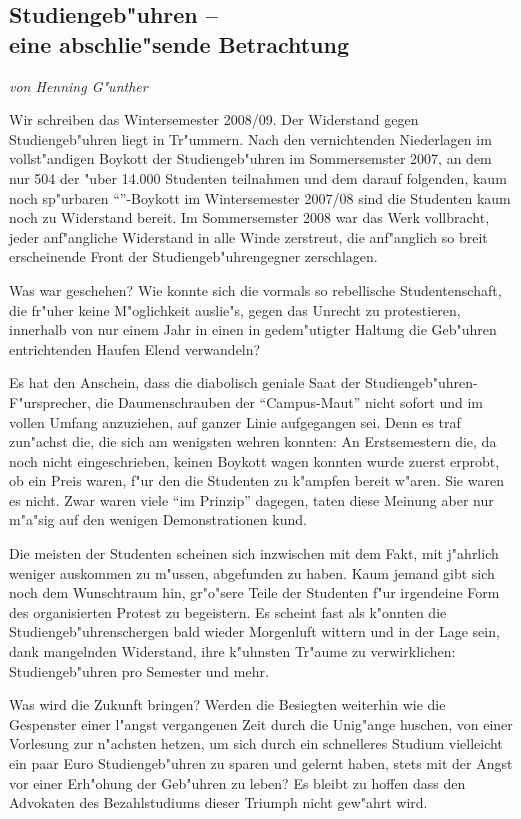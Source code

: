 \subsection[Studiengeb"uhren]{Studiengeb"uhren --\\ eine abschlie"sende
Betrachtung}
\emph{von Henning G"unther}

Wir schreiben das Wintersemester 2008/09.
Der Widerstand gegen Studiengeb"uhren liegt in Tr"ummern.
Nach den vernichtenden Niederlagen im voll\-st"an\-di\-gen Boykott der Studiengeb"uhren im Sommersemster 2007, an dem nur 504 der "uber 14.000 Studenten teilnahmen und dem darauf folgenden, kaum noch sp"urbaren "`\unit[5]{\EUR}{}"'-Boykott im Wintersemester 2007/08 sind die Studenten kaum noch zu Widerstand bereit.
Im Sommersemster 2008 war das Werk vollbracht, jeder anf"angliche Widerstand in alle Winde zerstreut, die anf"anglich so breit erscheinende Front der Studiengeb"uhrengegner zerschlagen.

Was war geschehen?
Wie konnte sich die vormals so rebellische Studentenschaft, die fr"uher keine M"oglichkeit auslie"s, gegen das Unrecht zu protestieren, innerhalb von nur einem Jahr in einen in gedem"utigter Haltung die Geb"uhren entrichtenden Haufen Elend verwandeln?

Es hat den Anschein, dass die diabolisch geniale Saat der Studiengeb"uhren-F"ursprecher, die Daumenschrauben der "`Campus-Maut"' nicht sofort und im vollen Umfang anzuziehen, auf ganzer Linie aufgegangen sei.
Denn es traf zun"achst die, die sich am wenigsten wehren konnten:
An Erstsemestern die, da noch nicht eingeschrieben, keinen Boykott wagen
konnten wurde zuerst erprobt, ob \unit[500]{\EUR}{} ein Preis waren, f"ur den die Studenten zu k"ampfen bereit w"aren. Sie waren es nicht.
Zwar waren viele "`im Prinzip"' dagegen, taten diese Meinung aber nur m"a"sig auf den wenigen Demonstrationen kund.

Die meisten der Studenten scheinen sich inzwischen mit dem Fakt, mit j"ahrlich
\unit[1000]{\EUR}{} weniger auskommen zu m"ussen, abgefunden zu haben. Kaum jemand gibt sich noch dem Wunschtraum hin, gr"o"sere Teile der Studenten f"ur irgendeine Form des organisierten Protest zu begeistern.
Es scheint fast als k"onnten die Studiengeb"uhrenschergen bald wieder Morgenluft wittern und in der Lage sein, dank mangelnden Widerstand, ihre k"uhnsten Tr"aume zu verwirklichen: \unit[1000]{\EUR}{} Studiengeb"uhren pro Semester und mehr.

Was wird die Zukunft bringen?
Werden die Besiegten weiterhin wie die Gespenster einer l"angst vergangenen Zeit durch die Unig"ange huschen, von einer Vorlesung zur n"achsten hetzen, um sich durch ein schnelleres Studium vielleicht ein paar Euro Studiengeb"uhren zu sparen und gelernt haben, stets mit der Angst vor einer Erh"ohung der Geb"uhren zu leben?
Es bleibt zu hoffen dass den Advokaten des Bezahlstudiums dieser Triumph nicht gew"ahrt wird.
